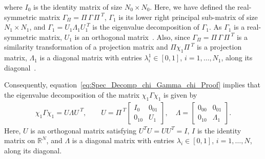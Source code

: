 \documentclass{cmslatex}
\begin{document}
%
where $I_0$ is the identity matrix of size $N_0\times N_0$. Here, we have
defined the real-symmetric matrix $\Gamma_\Pi=\Pi\,\Gamma\,\Pi^{\;T}$, $\Gamma_1$ is its
lower right principal sub-matrix of size $N_1\times N_1$, and
$\Gamma_1=U_1\Lambda_1U_1^{\;T}$ is the eigenvalue decomposition of $\Gamma_1$. As
$\Gamma_1$ is a real-symmetric matrix, $U_1$ is an orthogonal
matrix~\cite{Horn_Johnson-1990}. Also, since $\Gamma_\Pi=\Pi\,\Gamma\,\Pi^{\;T}$ is a 
similarity transformation of a projection matrix and $\Pi\chi_1\Pi^{\;T}$ is
a projection matrix, $\Lambda_1$ is a diagonal matrix with entries
$\lambda_i^1\in[0,1]$, $i=1,\ldots,N_1$, along its
diagonal~\cite{Horn_Johnson-1990,Demmel:1997}.  




Consequently, equation~\eqref{eq:Spec_Decomp_chi_Gamma_chi_Proof}
implies that the 
eigenvalue decomposition of the matrix $\chi_1\Gamma\chi_1$ is given by 
%
\begin{align}\label{eq:Spec_Decomp_chi_Gamma_chi}
\chi_1\Gamma\chi_1=U\Lambda U^{\;T},
\qquad
U=\Pi^{\;T}\left[
  \begin{array}{ccc}
    I_0&0_{01}\\
    0_{10}&U_1   
    \end{array}
\right],
\quad
\Lambda=\left[
  \begin{array}{ccc}
    0_{00}&0_{01}\\
    0_{10}&\Lambda_1   
    \end{array}
\right].
\end{align}
%
Here, $U$ is an orthogonal matrix satisfying $U^TU=UU^T=I$, $I$ is the
identity matrix on $\mathbb{R}^N$, and $\Lambda$ is a diagonal matrix with
entries $\lambda_i\in[0,1]$, $i=1,\ldots,N$, along its diagonal.
\end{document}
